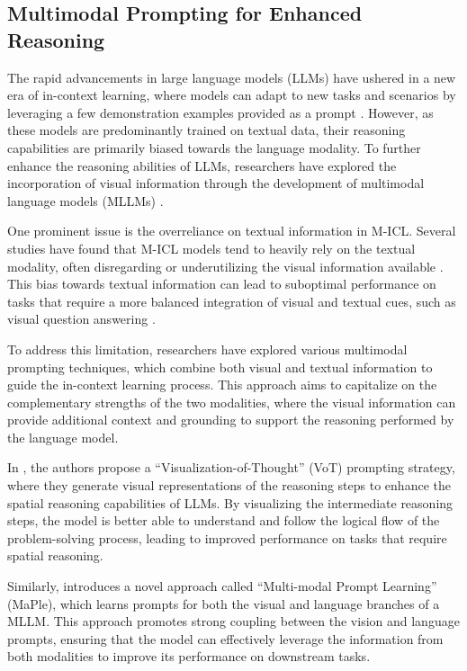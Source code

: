 \documentclass[11pt]{article}
\begin{document}
\subsection{Multimodal Prompting for Enhanced Reasoning}

The rapid advancements in large language models (LLMs) have ushered in a new era of in-context learning, where models can adapt to new tasks and scenarios by leveraging a few demonstration examples provided as a prompt \cite{ref301,ref309}. However, as these models are predominantly trained on textual data, their reasoning capabilities are primarily biased towards the language modality. To further enhance the reasoning abilities of LLMs, researchers have explored the incorporation of visual information through the development of multimodal language models (MLLMs) \cite{ref310}.

One prominent issue is the overreliance on textual information in M-ICL. Several studies have found that M-ICL models tend to heavily rely on the textual modality, often disregarding or underutilizing the visual information available \cite{ref297}. This bias towards textual information can lead to suboptimal performance on tasks that require a more balanced integration of visual and textual cues, such as visual question answering \cite{ref251}.

To address this limitation, researchers have explored various multimodal prompting techniques, which combine both visual and textual information to guide the in-context learning process. This approach aims to capitalize on the complementary strengths of the two modalities, where the visual information can provide additional context and grounding to support the reasoning performed by the language model.

In \cite{ref299}, the authors propose a ``Visualization-of-Thought'' (VoT) prompting strategy, where they generate visual representations of the reasoning steps to enhance the spatial reasoning capabilities of LLMs. By visualizing the intermediate reasoning steps, the model is better able to understand and follow the logical flow of the problem-solving process, leading to improved performance on tasks that require spatial reasoning.

Similarly, \cite{ref311} introduces a novel approach called ``Multi-modal Prompt Learning'' (MaPle), which learns prompts for both the visual and language branches of a MLLM. This approach promotes strong coupling between the vision and language prompts, ensuring that the model can effectively leverage the information from both modalities to improve its performance on downstream tasks.
\end{document}
